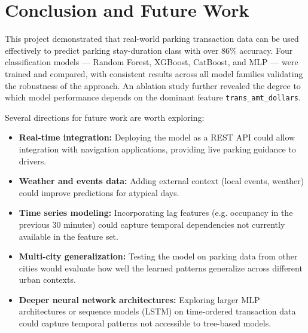 \documentclass[12pt, a4paper]{article}
\begin{document}
\section{Conclusion and Future Work}

This project demonstrated that real-world parking transaction data
can be used effectively to predict parking stay-duration class with
over 86\% accuracy. Four classification models --- Random Forest,
XGBoost, CatBoost, and MLP --- were trained and compared, with
consistent results across all model families validating the robustness
of the approach. An ablation study further revealed the degree to
which model performance depends on the dominant feature
\texttt{trans\_amt\_dollars}.

Several directions for future work are worth exploring:

\begin{itemize}
    \item \textbf{Real-time integration:} Deploying the model as a
    REST API could allow integration with navigation applications,
    providing live parking guidance to drivers.

    \item \textbf{Weather and events data:} Adding external context
    (local events, weather) could improve predictions for atypical days.

    \item \textbf{Time series modeling:} Incorporating lag features
    (e.g. occupancy in the previous 30 minutes) could capture temporal
    dependencies not currently available in the feature set.

    \item \textbf{Multi-city generalization:} Testing the model on
    parking data from other cities would evaluate how well the learned
    patterns generalize across different urban contexts.

    \item \textbf{Deeper neural network architectures:} Exploring
    larger MLP architectures or sequence models (LSTM) on time-ordered
    transaction data could capture temporal patterns not accessible
    to tree-based models.
\end{itemize}


\end{document}

